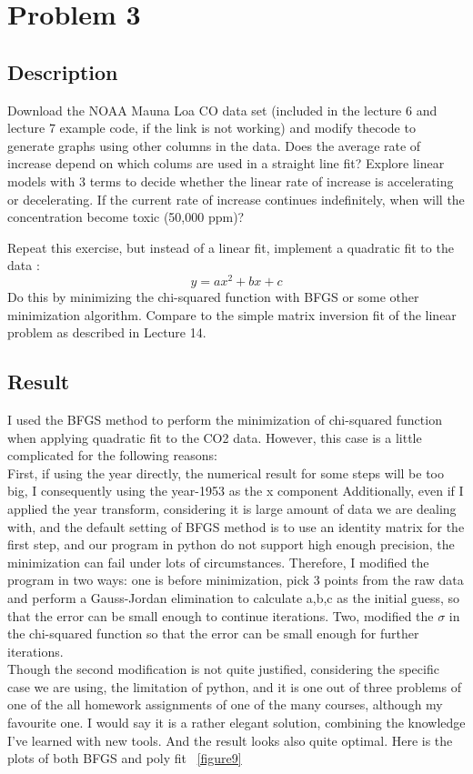 \documentclass[11pt,letterpaper]{article}
\begin{document}
\newpage

\section{Problem 3}
\subsection{Description}
Download the NOAA Mauna Loa CO   data set (included in the lecture 6 and lecture 7 example code, if the link is not working) and modify thecode to generate graphs using other columns in the data. Does the average rate of increase depend on which colums are used in a straight line fit? Explore linear models with 3 terms to decide whether the linear rate of increase is accelerating or decelerating. If the current rate of increase continues indefinitely, when will the concentration become toxic (50,000 ppm)?

Repeat this exercise, but instead of a linear fit, implement a quadratic fit to the data :
$$
y=ax^2+bx+c
$$
Do this by minimizing the chi-squared function with BFGS or some other minimization algorithm. Compare to the simple matrix inversion fit of the linear problem as described in Lecture 14. 

\subsection{Result}
I used the BFGS method to perform the minimization of chi-squared function when applying quadratic fit to the CO2 data. However, this case is a little complicated for the following reasons:\\
First, if using the year directly, the numerical result for some steps will be too big, I consequently using the year-1953 as the x component
Additionally, even if I applied the year transform, considering it is large amount of data we are dealing with, and the default setting of BFGS method is to use an identity matrix for the first step, and our program in python do not support high enough precision, the minimization can fail under lots of circumstances. Therefore, I modified the program in two ways: one is before minimization, pick 3 points from the raw data and perform a Gauss-Jordan elimination to calculate a,b,c as the initial guess, so that the error can be small enough to continue iterations. Two, modified the $\sigma$ in the chi-squared function so that the error can be small enough for further iterations.\\
Though the second modification is not quite justified, considering the specific case we are using, the limitation of python, and it is one out of three problems of one of the all homework assignments of one of the many courses, although my favourite one. I would say it is a rather elegant solution, combining the knowledge I've learned with new tools. And the result looks also quite optimal. Here is the plots of both BFGS and poly fit ~\ref{figure9}  
\end{document}

